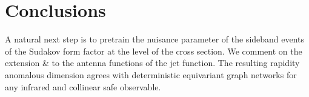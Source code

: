 \section{Conclusions}\label{sec:conclusions}

A natural next step is to pretrain the nuisance parameter of the
sideband events of the Sudakov form factor at the level of the cross
section. We comment on the extension & to the antenna functions of the jet
function. The resulting rapidity anomalous dimension agrees with
deterministic equivariant graph networks for any infrared and collinear
safe observable.

